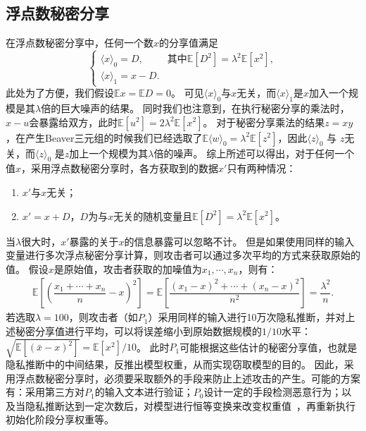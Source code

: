 \subsection{浮点数秘密分享}
在浮点数秘密分享中，任何一个数$x$的分享值满足
\begin{equation}
\begin{cases}
    \langle x \rangle_0 = D, & \text{其中} \mathbb E[D^2] = \lambda^2\mathbb E[x^2], \\
    \langle x \rangle_1 = x - D.
\end{cases}
\end{equation}
此处为了方便，我们假设$\mathbb Ex = \mathbb ED = 0$。
%
可见$\langle x \rangle_0$与$x$无关，而$\langle x \rangle_1$是$x$加入一个规模是其$\lambda$倍的巨大噪声的结果。
%
同时我们也注意到，在执行秘密分享的乘法时，$x - u$会暴露给双方，此时$\mathbb E[u^2] = 2\lambda^2 \mathbb E[x^2]$。
%
对于秘密分享乘法的结果$z = xy$，在产生Beaver三元组的时候我们已经选取了$\mathbb E \langle w \rangle_0 = \lambda^2 \mathbb E[z^2]$，因此$\langle z \rangle_0$ 与 $z$无关，而$\langle z \rangle_0$ 是$z$加上一个规模为其$\lambda$倍的噪声。
%
综上所述可以得出，对于任何一个值$x$，采用浮点数秘密分享时，各方获取到的数据$x'$只有两种情况：
\begin{enumerate}[label=(\arabic*)]
    \item $x'$与$x$无关；
    \item $x' = x + D$，$D$为与$x$无关的随机变量且$\mathbb E[D^2] = \lambda^2 \mathbb E[x^2]$。
\end{enumerate}
%
当$\lambda$很大时，$x'$暴露的关于$x$的信息暴露可以忽略不计。
%
但是如果使用同样的输入变量进行多次浮点秘密分享计算，则攻击者可以通过多次平均的方式来获取原始的值。
%
假设$x$是原始值，攻击者获取的加噪值为$x_1, \cdots, x_n$，则有：
\begin{equation}
\begin{split}
    \mathbb E\left[\left(\dfrac{x_1 + \cdots + x_n}{n} - x \right)^2 \right] = 
    \mathbb E\left[\dfrac{(x_1 - x)^2 + \cdots + (x_n - x)^2}{n^2} \right] =
    \dfrac{\lambda^2}{n}.
\end{split}
\end{equation}
%
若选取$\lambda = 100$，则攻击者（如$P_1$）采用同样的输入进行10万次隐私推断，并对上述秘密分享值进行平均，可以将误差缩小到原始数据规模的$1/10$水平：
$\sqrt{\mathbb E[(\bar x - x)^2]} = {\mathbb E[x^2]}/{10}$。
%
此时$P_1$可能根据这些估计的秘密分享值，也就是隐私推断中的中间结果，反推出模型权重，从而实现窃取模型的目的。
%
因此，采用浮点数秘密分享时，必须要采取额外的手段来防止上述攻击的产生。可能的方案有：采用第三方对$P_1$的输入文本进行验证；$P_0$设计一定的手段检测恶意行为；以及当隐私推断达到一定次数后，对模型进行恒等变换来改变权重值~\cite{xuhengyuan_2024_permutation_transformer}，再重新执行初始化阶段分享权重等。
%


